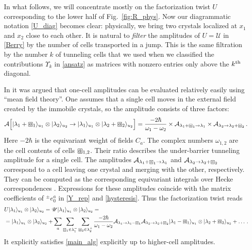 \documentclass[10pt]{article}
\theoremstyle{definition}
\def\CA{{\cal A}}
\def\sU{{\mathscr{U}}}
\def\lm{\limits}
\numberwithin{equation}{section}
\newcommand\sqbox[1]{{
		\setbox0=\hbox{\mbox{$\Box$}}
		\setbox1=\hbox{\mbox{\raisebox{0.35ex}{\small #1}}}
		\mbox{\raisebox{-0.2ex}{\rlap{\hbox to \wd0{\hss{\box1}\hss}}\box0}}
}}
\newcommand\ssqbox[1]{{
		\setbox0=\hbox{\mbox{$\scriptstyle\Box$}}
		\setbox1=\hbox{\mbox{\raisebox{0.35ex}{\tiny #1}}}
		\mbox{\raisebox{-0.2ex}{\rlap{\hbox to \wd0{\hss{\box1}\hss}}\box0}}
}}
\begin{document}
In what follows, we will concentrate mostly on the factorization twist $U$ corresponding to the lower half of Fig.~\ref{fig:R_phys}.
Now our diagrammatic notation \eqref{U_diag} becomes clear: physically, we bring two crystals localized at $x_1$ and $x_2$ close to each other.
It is natural to \emph{filter} the amplitudes of $U=\sU$ in \eqref{Berry} by the number of cells transported in a jump.
This is the same filtration by the number $k$ of tunneling cells that we used when we classified the contributions $\Upsilon_k$ in \eqref{ansatz} as matrices with nonzero entries only above the $k^{\rm th}$ diagonal.

In \cite{Galakhov:2025fhd} it was argued that one-cell amplitudes can be evaluated relatively easily using ``mean field theory''.
One assumes that a single cell moves in the external field created by the immobile crystals, so the amplitude consists of three factors:
\begin{equation}\label{1-tunnel}
	\CA\Big[|\lambda_1+\sqbox{$a$}_1\rangle_{u_1}\otimes |\lambda_2\rangle_{u_2}\to|\lambda_1\rangle_{u_1}\otimes |\lambda_2+\sqbox{$a$}_2\rangle_{u_2}\Big]=\frac{-2\hbar}{\omega_1-\omega_2}\times\CA_{\lambda_1+\ssqbox{$a$}_1\to\lambda_1}\times\CA_{\lambda_2\to\lambda_2+\ssqbox{$a$}_2}\,.
\end{equation}
Here $-2\hbar$ is the equivariant weight of fields $C_a$.
The complex numbers $\omega_{1,2}$ are the cell contents of cells $\sqbox{$a$}_{1,2}$.
Their ratio describes the under-barrier tunneling amplitude for a single cell.
The amplitudes $\CA_{\lambda_1+\ssqbox{$a$}_1\to\lambda_1}$ and $\CA_{\lambda_2\to\lambda_2+\ssqbox{$a$}_2}$ correspond to a cell leaving one crystal and merging with the other, respectively.
They can be computed as the corresponding equivariant integrals over Hecke correspondences \cite{Galakhov:2024bzs}.
Expressions for these amplitudes coincide with the matrix coefficients of ${}^{\pm}e_0^a$ in \eqref{Y_rep} and \eqref{hysteresis}.
Thus the factorization twist reads
\begin{equation}\label{1-cell}
	\begin{aligned}
	&U|\lambda_1\rangle_{u_1}\otimes |\lambda_2\rangle_{u_2}=\sU|\lambda_1\rangle_{u_1}\otimes |\lambda_2\rangle_{u_2}=\\
	&=|\lambda_1\rangle_{u_1}\otimes |\lambda_2\rangle_{u_2}+\sum\lm_a\sum\lm_{\ssqbox{$a$}_1\in\lambda_1^-}\sum\lm_{\ssqbox{$a$}_2\in\lambda_2^+}\frac{-2\hbar}{\omega_1-\omega_2}\CA_{\lambda_1\to\lambda_1-\ssqbox{$a$}_1}\CA_{\lambda_2\to\lambda_2+\ssqbox{$a$}_2}|\lambda_1-\sqbox{$a$}_1\rangle_{u_1}\otimes |\lambda_2+\sqbox{$a$}_2\rangle_{u_2}+\ldots\,.
	\end{aligned}
\end{equation}
\noindent It explicitly satisfies \eqref{main_alg} explicitly up to higher-cell amplitudes.
\end{document}
